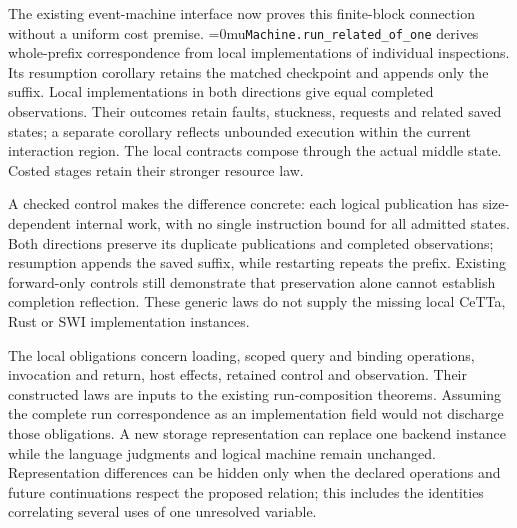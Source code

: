 \documentclass[11pt,a4paper]{article}
\newcommand{\name}[1]{\textup{\Urlmuskip=0mu\relax\nolinkurl{#1}}}
\begin{document}
The existing event-machine interface now proves this finite-block connection
without a uniform cost premise. \name{Machine.run_related_of_one} derives
whole-prefix correspondence from local implementations of individual
inspections. Its resumption corollary retains the matched checkpoint and
appends only the suffix. Local implementations in both directions give equal
completed observations. Their outcomes retain faults, stuckness, requests and
related saved states; a separate corollary reflects unbounded execution within
the current interaction region. The local contracts compose through the
actual middle state. Costed stages retain their stronger resource law.

A checked control makes the difference concrete: each logical publication
has size-dependent internal work, with no single instruction bound for all
admitted states. Both directions preserve its duplicate publications and
completed observations; resumption appends the saved suffix, while restarting
repeats the prefix. Existing forward-only controls still demonstrate that
preservation alone cannot establish completion reflection. These generic laws
do not supply the missing local CeTTa, Rust or SWI implementation instances.

The local obligations concern loading, scoped query and binding operations,
invocation and return, host effects, retained control and observation.
Their constructed laws are inputs to the existing run-composition theorems.
Assuming the complete run correspondence as an implementation field would
not discharge those obligations. A new storage representation can replace
one backend instance while the language judgments and logical machine remain
unchanged. Representation differences can be hidden only when the declared
operations and future continuations respect the proposed relation; this
includes the identities correlating several uses of one unresolved variable.
\end{document}
